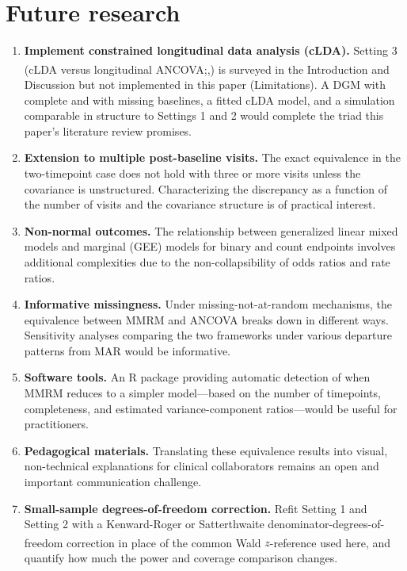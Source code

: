 \documentclass[
  11pt,
]{article}
\begin{document}
\section{Future research}\label{future-research}

\begin{enumerate}
\def\labelenumi{\arabic{enumi}.}
\item
  \textbf{Implement constrained longitudinal data analysis
  (cLDA).} Setting 3 (cLDA versus longitudinal ANCOVA;\textsuperscript{},\textsuperscript{}) is surveyed
  in the Introduction and Discussion but not implemented
  in this paper (Limitations). A DGM with complete and
  with missing baselines, a fitted cLDA model, and a
  simulation comparable in structure to Settings 1 and 2
  would complete the triad this paper's literature review
  promises.
\item
  \textbf{Extension to multiple post-baseline visits.} The
  exact equivalence in the two-timepoint case does
  not hold with three or more visits unless the
  covariance is unstructured. Characterizing the
  discrepancy as a function of the number of visits
  and the covariance structure is of practical
  interest.
\item
  \textbf{Non-normal outcomes.} The relationship between
  generalized linear mixed models and marginal (GEE)
  models for binary and count endpoints involves
  additional complexities due to the
  non-collapsibility of odds ratios and rate ratios.
\item
  \textbf{Informative missingness.} Under
  missing-not-at-random mechanisms, the equivalence
  between MMRM and ANCOVA breaks down in different
  ways. Sensitivity analyses comparing the two
  frameworks under various departure patterns from
  MAR would be informative.
\item
  \textbf{Software tools.} An R package providing automatic
  detection of when MMRM reduces to a simpler
  model---based on the number of timepoints,
  completeness, and estimated variance-component
  ratios---would be useful for practitioners.
\item
  \textbf{Pedagogical materials.} Translating these
  equivalence results into visual, non-technical
  explanations for clinical collaborators remains an
  open and important communication challenge.
\item
  \textbf{Small-sample degrees-of-freedom correction.} Refit
  Setting 1 and Setting 2 with a Kenward-Roger or
  Satterthwaite denominator-degrees-of-freedom
  correction\textsuperscript{} in place of the common
  Wald \(z\)-reference used here, and quantify how much
  the power and coverage comparison changes.
\end{enumerate}
\end{document}

